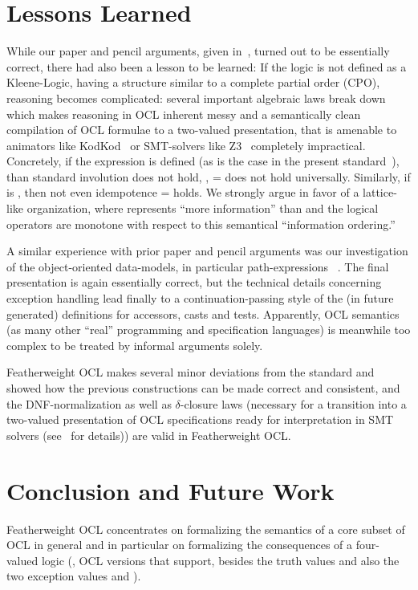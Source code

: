 \section{Lessons Learned}
While our paper and pencil arguments, given
in~\cite{brucker.ea:ocl-null:2009}, turned out to be essentially
correct, there had also been a lesson to be learned: If the logic is
not defined as a Kleene-Logic, having a structure similar to a
complete partial order (CPO), reasoning becomes complicated: several
important algebraic laws break down which makes reasoning in OCL
inherent messy and a semantically clean compilation of OCL formulae to
a two-valued presentation, that is amenable to animators like
KodKod~\cite{torlak.ea:kodkod:2007} or SMT-solvers like
Z3~\cite{moura.ea:z3:2008} completely impractical. Concretely, if the
expression  is defined  (as is
the case in the present standard~\cite{omg:ocl:2012}), than standard
involution does not hold, \ie,  = 
does not hold universally. Similarly, if  is
, then not even idempotence  =
 holds. We strongly argue in favor of a lattice-like
organization, where  represents ``more information''
than  and the logical operators are monotone with
respect to this semantical ``information ordering.''

A similar experience with prior paper and pencil arguments was our
investigation of the object-oriented data-models, in particular
path-expressions ~\cite{DBLP:conf/models/BruckerLTW13}. The final
presentation is again essentially correct, but the technical details
concerning exception handling lead finally to a continuation-passing
style of the (in future generated) definitions for accessors, casts
and tests.  Apparently, OCL semantics (as many other ``real''
programming and specification languages) is meanwhile too complex to
be treated by informal arguments solely.

Featherweight OCL makes several minor deviations from the standard and
showed how the previous constructions can be made correct and
consistent, and the DNF-normalization as well as $\delta$-closure laws
(necessary for a transition into a two-valued presentation of OCL
specifications ready for interpretation in SMT solvers
(see~\cite{brucker.ea:ocl-testing:2010} for details)) are valid in
Featherweight OCL.

\section{Conclusion and Future Work}
Featherweight OCL concentrates on formalizing the semantics of a core
subset of OCL in general and in particular on formalizing the
consequences of a four-valued logic (\ie, OCL versions that support,
besides the truth values  and  also
the two exception values  and ).

